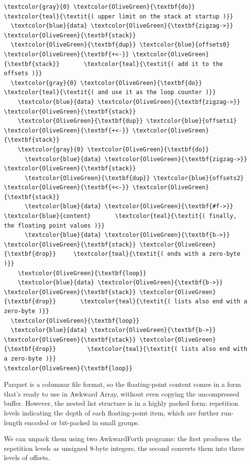 \documentclass{webofc}
\begin{document}
\begin{Verbatim}[commandchars=\\\{\}]
\textcolor{gray}{0} \textcolor{OliveGreen}{\textbf{do}}                          \textcolor{teal}{\textit{( upper limit on the stack at startup )}}
  \textcolor{blue}{data} \textcolor{OliveGreen}{\textbf{zigzag->}} \textcolor{OliveGreen}{\textbf{stack}}
  \textcolor{OliveGreen}{\textbf{dup}} \textcolor{blue}{offsets0} \textcolor{OliveGreen}{\textbf{+<-}} \textcolor{OliveGreen}{\textbf{stack}}       \textcolor{teal}{\textit{( add it to the offsets )}}
  \textcolor{gray}{0} \textcolor{OliveGreen}{\textbf{do}}                        \textcolor{teal}{\textit{( and use it as the loop counter )}}
    \textcolor{blue}{data} \textcolor{OliveGreen}{\textbf{zigzag->}} \textcolor{OliveGreen}{\textbf{stack}}
    \textcolor{OliveGreen}{\textbf{dup}} \textcolor{blue}{offsets1} \textcolor{OliveGreen}{\textbf{+<-}} \textcolor{OliveGreen}{\textbf{stack}}
    \textcolor{gray}{0} \textcolor{OliveGreen}{\textbf{do}}
      \textcolor{blue}{data} \textcolor{OliveGreen}{\textbf{zigzag->}} \textcolor{OliveGreen}{\textbf{stack}}
      \textcolor{OliveGreen}{\textbf{dup}} \textcolor{blue}{offsets2} \textcolor{OliveGreen}{\textbf{+<-}} \textcolor{OliveGreen}{\textbf{stack}}
      \textcolor{blue}{data} \textcolor{OliveGreen}{\textbf{#f->}} \textcolor{blue}{content}       \textcolor{teal}{\textit{( finally, the floating point values )}}
      \textcolor{blue}{data} \textcolor{OliveGreen}{\textbf{b->}} \textcolor{OliveGreen}{\textbf{stack}} \textcolor{OliveGreen}{\textbf{drop}}     \textcolor{teal}{\textit{( ends with a zero-byte )}}
    \textcolor{OliveGreen}{\textbf{loop}}
    \textcolor{blue}{data} \textcolor{OliveGreen}{\textbf{b->}} \textcolor{OliveGreen}{\textbf{stack}} \textcolor{OliveGreen}{\textbf{drop}}       \textcolor{teal}{\textit{( lists also end with a zero-byte )}}
  \textcolor{OliveGreen}{\textbf{loop}}
  \textcolor{blue}{data} \textcolor{OliveGreen}{\textbf{b->}} \textcolor{OliveGreen}{\textbf{stack}} \textcolor{OliveGreen}{\textbf{drop}}         \textcolor{teal}{\textit{( lists also end with a zero-byte )}}
\textcolor{OliveGreen}{\textbf{loop}}
\end{Verbatim}

\noindent Parquet is a columnar file format, so the floating-point content comes in a form that's ready to use in Awkward Array, without even copying the uncompressed buffer. However, the nested list structure is in a highly packed form: repetition levels indicating the depth of each floating-point item, which are further run-length encoded or bit-packed in small groups.

We can unpack them using two AwkwardForth programs: the first produces the repetition levels as unsigned 8-byte integers, the second converts them into three levels of offsets.
\end{document}
